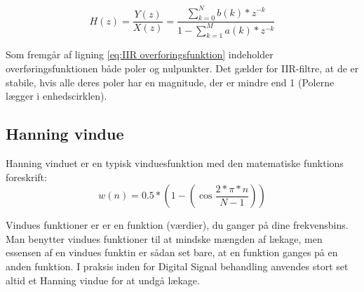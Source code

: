 \begin{equation}\label{eq:IIR overforingsfunktion}
{H(z)} =\frac{Y(z)}{X(z)} =\frac{\displaystyle\sum_{k=0}^{N} {b(k)*z^{-k}}}{1-\displaystyle\sum_{k=1}^{M} {a(k)*z^{-k}}}
\end{equation}

Som fremgår af ligning \eqref{eq:IIR overforingsfunktion} indeholder overføringsfunktionen både poler og nulpunkter. Det gælder for IIR-filtre, at de er stabile, hvis alle deres poler har en magnitude, der er mindre end 1 (Polerne lægger i enhedscirklen).

\subsection{Hanning vindue}
Hanning vinduet er en typisk vinduesfunktion med den matematiske funktions foreskrift:
\begin{equation}\label{eq:Hanning}
{w(n)} ={0.5*(1-(\cos \frac{2*\pi*n}{N-1}))}
\end{equation}


Vindues funktioner er er en funktion (værdier), du ganger på dine frekvensbins. Man benytter vindues funktioner til at mindske mængden af lækage, men essensen af en vindues funktin er sådan set bare, at en funktion ganges på en anden funktion. I praksis inden for Digital Signal behandling anvendes stort set altid et Hanning vindue for at undgå lækage.
